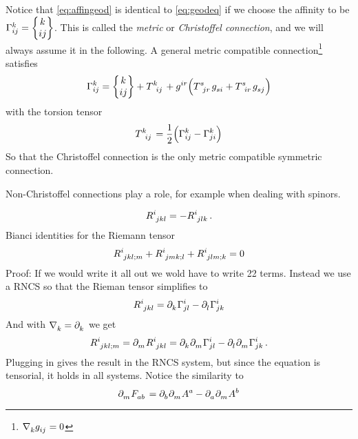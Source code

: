 Notice that \eqref{eq:affingeod} is identical to \eqref{eq:geodeq} if we choose
the affinity to be $\Gamma^{k}_{i j}=\begin{Bmatrix} k \\ i j \end{Bmatrix}$. This is called the
\emph{metric} or \emph{Christoffel connection}, and we will
always assume it in the following.
A general metric compatible
connection\footnote{$\tensor{\nabla}{_k}\tensor{g}{_i_j}=0$} satisfies
\begin{equation}
\affin{k}{i}{j}=\cSym{k}{i}{j}+\tensor{T}{^k_i_j}
+\tensor{g}{^i^r}\left(\tensor{T}{^s_j_r}\tensor{g}{_s_i}+\tensor{T}{^s_i_r}\tensor{g}{_s_j}\right)
\end{equation}
with the torsion tensor
\begin{equation}
\tensor{T}{^k_i_j}=\frac{1}{2}\left(\affin{k}{i}{j}-\affin{k}{j}{i}\right)
\end{equation}
So that the Christoffel connection is the only metric compatible symmetric
connection.
\begin{remark}
Non-Christoffel connections play a role, for example when dealing with spinors.
\end{remark}
\begin{equation}
\tensor{R}{^i_j_k_l}=-\tensor{R}{^i_j_l_k}\,.
\end{equation}
Bianci identities for the Riemann tensor
\begin{equation}
\tensor{R}{^i_j_k_l_{;m}}+\tensor{R}{^i_j_m_k_{;l}}+\tensor{R}{^i_j_l_m_{;k}}=0
\end{equation}
Proof: If we would write it all out we wold have to write 22 terms. Instead we
use a RNCS so that the Rieman tensor simplifies to 
\begin{equation}
\tensor{R}{^i_j_k_l}
=\tensor{\partial}{_k}\affin{i}{j}{l}
-\tensor{\partial}{_l}\affin{i}{j}{k}
\end{equation}
And with $\tensor{\nabla}{_k}=\tensor{\partial}{_k}$ we get
\begin{equation}
\tensor{R}{^i_j_k_l_{;m}}
=\tensor{\partial}{_m}\tensor{R}{^i_j_k_l}
=\tensor{\partial}{_k}\tensor{\partial}{_m}\affin{i}{j}{l}
-\tensor{\partial}{_l}\tensor{\partial}{_m}\affin{i}{j}{k}\,.
\end{equation}
Plugging in gives the result in the RNCS system, but since the equation is
tensorial, it holds in all systems. Notice the similarity to 
\begin{equation}
\tensor{\partial}{_m}\tensor{F}{_a_b}
=\tensor{\partial}{_b}\tensor{\partial}{_m}\tensor{A}{^a}
-\tensor{\partial}{_a}\tensor{\partial}{_m}\tensor{A}{^b}
\end{equation}

